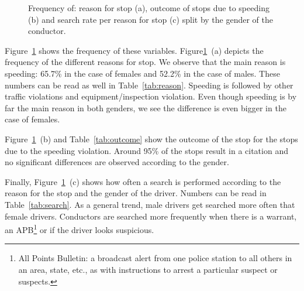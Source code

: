 \documentclass{article}
\begin{document}
\begin{figure}[h]
\caption{Frequency of: reason for stop (a), outcome of stops due to speeding (b) and search rate per reason for stop (c) split by the gender of the conductor.} \label{gender_studies}
\end{figure}   
 
Figure~\ref{gender_studies} shows the frequency of these variables. Figure\ref{gender_studies}~(a) depicts the frequency of the different reasons for stop. We observe that the main reason is speeding: 65.7\% in the case of females and 52.2\% in the case of males. These numbers can be read as well in Table~\ref{tab:reason}. Speeding is followed by other traffic violations and equipment/inspection violation. Even though speeding is by far the main reason in both genders, we see the difference is even bigger in the case of females. 

Figure~\ref{gender_studies}~(b) and Table~\ref{tab:outcome} show the outcome of the stop for the stops due to the speeding violation.  Around 95\% of the stops result in a citation and no significant differences are observed according to the gender.

Finally, Figure~\ref{gender_studies}~(c) shows how often a search is performed according to the reason for the stop and the gender of the driver. Numbers can be read in Table~\ref{tab:search}. As a general trend, male drivers get searched more often that female drivers. Conductors are searched more frequently when there is a warrant, an APB\footnote{All Points Bulletin: a broadcast alert from one police station to all others in an area, state, etc., as with instructions to arrest a particular suspect or suspects.} or if the driver looks suspicious.
\end{document}
